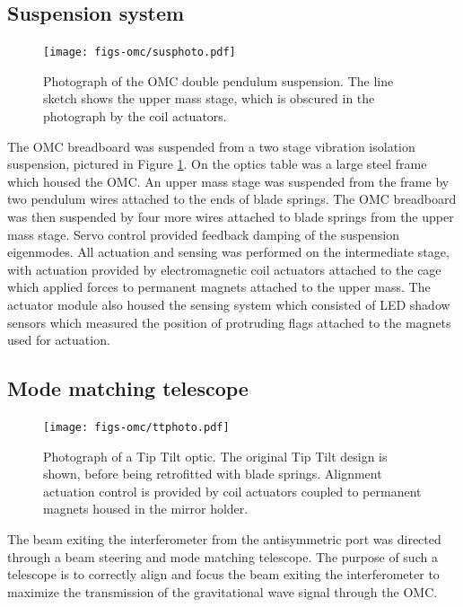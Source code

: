 \subsection{Suspension system}
\begin{figure}
  \begin{center}
  \leavevmode
  \texttt{[image: figs-omc/susphoto.pdf]}
  \end{center}
  \caption[Photograph of the OMC double pendulum suspension.]{Photograph of the OMC double pendulum suspension. The line sketch shows the upper mass stage, which is obscured in the photograph by the coil actuators.}
  \label{fig:susphoto}
\end{figure}

The OMC breadboard was suspended from a two stage vibration isolation suspension, pictured in Figure \ref{fig:susphoto}. %
On the optics table was a large steel frame which housed the OMC. %
An upper mass stage was suspended from the frame by two pendulum wires attached to the ends of blade springs. %
The OMC breadboard was then suspended by four more wires attached to blade springs from the upper mass stage. %
Servo control provided feedback damping of the suspension eigenmodes. %
All actuation and sensing was performed on the intermediate stage, with actuation provided by electromagnetic coil actuators attached to the cage which applied forces to permanent magnets attached to the upper mass. %
The actuator module also housed the sensing system which consisted of LED shadow sensors which measured the position of protruding flags attached to the magnets used for actuation.

\subsection{Mode matching telescope}
\begin{figure}
  \begin{center}
  \leavevmode
  \texttt{[image: figs-omc/ttphoto.pdf]}
  \end{center}
  \caption[Photograph of a Tip Tilt optic.]{Photograph of a Tip Tilt optic. The original Tip Tilt design is shown, before being retrofitted with blade springs. Alignment actuation control is provided by coil actuators coupled to permanent magnets housed in the mirror holder. }
  \label{fig:ttphoto}
\end{figure}
The beam exiting the interferometer from the antisymmetric port was directed through a beam steering and mode matching telescope. %
The purpose of such a telescope is to correctly align and focus the beam exiting the interferometer to maximize the transmission of the gravitational wave signal through the OMC.

